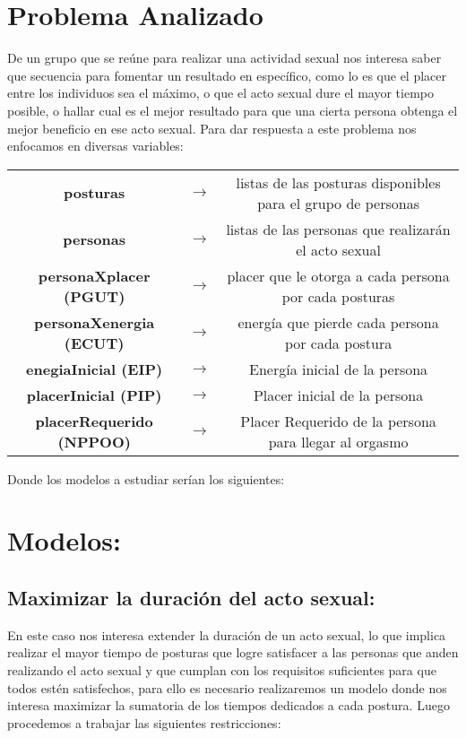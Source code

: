 \documentclass{llncs}
\begin{document}
\section{Problema Analizado}
De un grupo que se reúne para realizar una actividad sexual nos interesa saber que secuencia para fomentar un resultado en específico, como lo es que el placer entre los individuos sea el máximo, o que el acto sexual dure el mayor tiempo posible, o hallar cual es el mejor resultado para que una cierta persona obtenga el mejor beneficio en ese acto sexual.
\newline
\newline
Para dar respuesta a este problema nos enfocamos en diversas variables:

\begin{tabular}{ccc}
	\textbf{posturas} & $\rightarrow$ & listas de las posturas disponibles para el grupo de personas\\
	\textbf{personas} & $\rightarrow$ & listas de las personas que realizarán el acto sexual\\
	
	\textbf{personaXplacer (PGUT)} & $\rightarrow$ &  placer que le otorga a cada persona por cada posturas \\
	\textbf{personaXenergia (ECUT)} & $\rightarrow$ & energía que pierde cada persona por cada postura\\
	\textbf{enegiaInicial (EIP)} & $\rightarrow$ & Energía inicial de la persona\\
	\textbf{placerInicial (PIP)} & $\rightarrow$ & Placer inicial de la persona\\
	\textbf{placerRequerido (NPPOO)} & $\rightarrow$ & Placer Requerido de la persona para llegar al orgasmo
\end{tabular}
\newline
\newline
\newline
Donde los modelos a estudiar serían los siguientes:
	
\section{Modelos:}

\subsection{Maximizar la duración del acto sexual:}
En este caso nos interesa extender la duración de un acto sexual, lo que implica realizar el mayor tiempo de posturas que logre satisfacer a las personas que anden realizando el acto sexual y que cumplan con los requisitos suficientes para que todos estén satisfechos, para ello es necesario realizaremos un modelo donde nos interesa maximizar la sumatoria de los tiempos dedicados a cada postura.
\newline
\newline
Luego procedemos a trabajar las siguientes restricciones:
\end{document}
